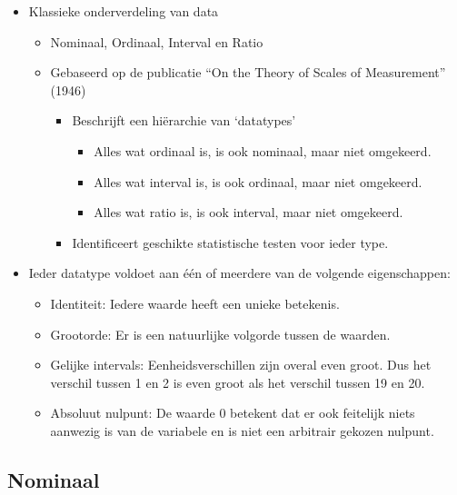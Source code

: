 \documentclass[]{memoir}
\providecommand{\tightlist}{%
  \setlength{\itemsep}{0pt}\setlength{\parskip}{0pt}}
\begin{document}
\begin{itemize}
\tightlist
\item
  Klassieke onderverdeling van data

  \begin{itemize}
  \tightlist
  \item
    Nominaal, Ordinaal, Interval en Ratio
  \item
    Gebaseerd op de publicatie ``On the Theory of Scales of Measurement'' (1946)

    \begin{itemize}
    \tightlist
    \item
      Beschrijft een hiërarchie van `datatypes'

      \begin{itemize}
      \tightlist
      \item
        Alles wat ordinaal is, is ook nominaal, maar niet omgekeerd.
      \item
        Alles wat interval is, is ook ordinaal, maar niet omgekeerd.
      \item
        Alles wat ratio is, is ook interval, maar niet omgekeerd.
      \end{itemize}
    \item
      Identificeert geschikte statistische testen voor ieder type.
    \end{itemize}
  \end{itemize}
\item
  Ieder datatype voldoet aan één of meerdere van de volgende eigenschappen:

  \begin{itemize}
  \tightlist
  \item
    Identiteit: Iedere waarde heeft een unieke betekenis.
  \item
    Grootorde: Er is een natuurlijke volgorde tussen de waarden.
  \item
    Gelijke intervals: Eenheidsverschillen zijn overal even groot. Dus het verschil tussen 1 en 2 is even groot als het verschil tussen 19 en 20.
  \item
    Absoluut nulpunt: De waarde 0 betekent dat er ook feitelijk niets aanwezig is van de variabele en is niet een arbitrair gekozen nulpunt.
  \end{itemize}
\end{itemize}

\hypertarget{nominaal}{%
\subsection*{Nominaal}\label{nominaal}}
\end{document}
